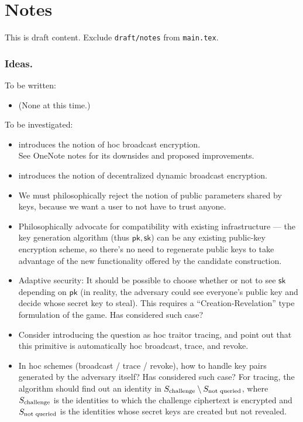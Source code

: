 \section{Notes}

\begingroup
\color{red}
This is draft content.
Exclude \texttt{draft/notes} from \texttt{main.tex}.
\endgroup

\subsubsection{Ideas.}
To be written:
\begin{itemize}
\item (None at this time.)
\end{itemize}
To be investigated:
\begin{itemize}
\item \cite{CCS:WQZD10} introduces the notion of \ad hoc broadcast encryption.\\
See OneNote notes for its downsides and proposed improvements.
\item \cite{SCN:PhaPoiStr12} introduces the notion of decentralized dynamic broadcast encryption.
\item We must philosophically reject the notion of public parameters shared by keys, because we want a user to not have to trust anyone.
\item Philosophically advocate for compatibility with existing infrastructure
--- the key generation algorithm (thus $\mathsf{pk},\mathsf{sk}$) can be any existing public-key encryption scheme, so there's no need to regenerate public keys to take advantage of the new functionality offered by the candidate construction.
\item Adaptive security: It should be possible to choose whether or not to see $\mathsf{sk}$ depending on $\mathsf{pk}$ (in reality, the adversary could see everyone's public key and decide whose secret key to steal). This requires a ``Creation-Revelation'' type formulation of the game.
Has \cite{CCS:WQZD10} considered such case?
\item Consider introducing the question as \ad hoc traitor tracing, and point out that this primitive is automatically \ad hoc broadcast, trace, and revoke.
\item In \ad hoc schemes (broadcast / trace / revoke), how to handle key pairs generated by the adversary itself?
Has \cite{CCS:WQZD10} considered such case?
For tracing, the algorithm should find out an identity in ${S_{\textup{challenge}}}\setminus S_{\textup{not queried}}$, where $S_{\textup{challenge}}$ is the identities to which the challenge ciphertext is encrypted and $S_{\textup{not queried}}$ is the identities whose secret keys are created but not revealed.

\end{itemize}
